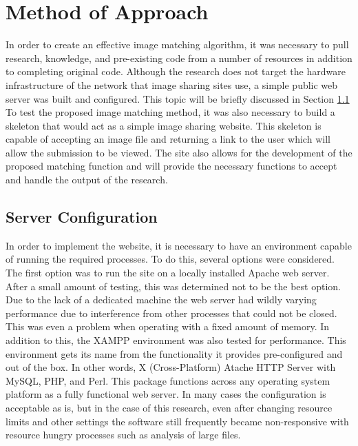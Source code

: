 %
%
%
\chapter{Method of Approach} \label{ch:method}
In order to create an effective image matching algorithm, it was necessary to pull research, knowledge, and pre-existing code from a number of resources in addition to completing original code. Although the research does not target the hardware infrastructure of the network that image sharing sites use, a simple public web server was built and configured. This topic will be briefly discussed in Section \ref{sec:serverconfig} To test the proposed image matching method, it was also necessary to build a skeleton that would act as a simple image sharing website. This skeleton is capable of accepting an image file and returning a link to the user which will allow the submission to be viewed. The site also allows for the development of the proposed matching function and will provide the necessary functions to accept and handle the output of the research.

\section{Server Configuration} \label{sec:serverconfig}
In order to implement the website, it is necessary to have an environment capable of running the required processes. To do this, several options were considered. The first option was to run the site on a locally installed Apache web server. After a small amount of testing, this was determined not to be the best option. Due to the lack of a dedicated machine the web server had wildly varying performance due to interference from other processes that could not be closed. This was even a problem when operating with a fixed amount of memory. In addition to this, the XAMPP environment was also tested for performance. This environment gets its name from the functionality it provides pre-configured and out of the box. In other words, X (Cross-Platform) Atache HTTP Server with MySQL, PHP, and Perl. This package functions across any operating system platform as a fully functional web server. In many cases the configuration is acceptable as is, but in the case of this research, even after changing resource limits and other settings the software still frequently became non-responsive with resource hungry processes such as analysis of large files.

